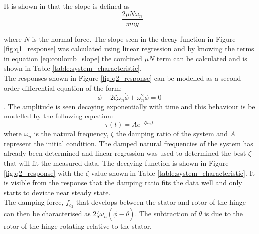 It is shown in \citet{coulomb_friction} that the slope is defined as 
\begin{equation} \label{eq:coulomb_slope}
-\frac{2\mu N \omega_{n}}{\pi mg}
\end{equation}

where $N$  is the normal force. The slope seen in the decay function in Figure \ref{fig:q1_response} was calculated using linear regression and by knowing the terms in equation \ref{eq:coulomb_slope} the combined $\mu N$ term can be calculated and is shown in Table \ref{table:system_characteristic}.\\

The responses shown in Figure \ref{fig:q2_response} can be modelled as a second order differential equation of the form: $$\ddot{\phi} + 2\zeta\omega_{n}\dot{\phi}+\omega_{n}^2\phi =0 $$. The amplitude is seen decaying exponentially with time and this behaviour is be modelled by the following equation: $$\tau(t) = Ae^{-\zeta \omega_{n}t}$$ where $\omega_{n}$ is the natural frequency, $\zeta$ the damping ratio of the system and $A$ represent the initial condition. The damped natural frequencies of the system has already been determined and linear regression was used to determined the best $\zeta$ that will fit the measured data. The decaying function is shown in Figure \ref{fig:q2_response} with the $\zeta$ value shown in Table \ref{table:system_characteristic}. It is visible from the response that the damping ratio fits the data well and only starts to deviate near steady state.\\

The damping force, $f_{c_{2}}$ that develops between the stator and rotor of the hinge can then be characterised as $2\zeta\omega_{n}(\dot{\phi}-\dot{\theta})$. The subtraction of $\dot{\theta}$ is due to the rotor of the hinge rotating relative to the stator.

